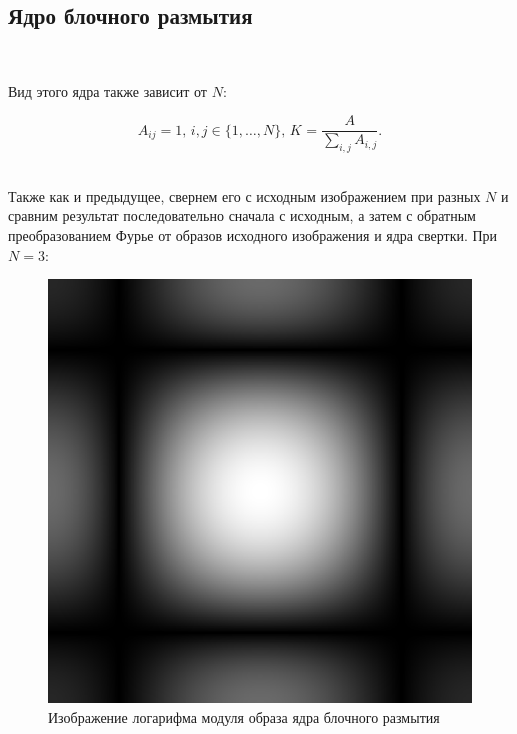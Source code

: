 \documentclass[a4paper]{article}
\begin{document}
\subsection{Ядро блочного размытия}\ 

Вид этого ядра также зависит от $N$:

$$
A_{ij} = 1, \, i,j \in \{1, \dots, N \}, \, K_{\boxed{}} = \frac{A}{\sum_{i,j} A_{i,j}}.
$$\ 

Также как и предыдущее, свернем его с исходным изображением при разных $N$ и сравним результат последовательно сначала с исходным, а затем с обратным преобразованием Фурье от образов исходного изображения и ядра свертки. При $N = 3$:

\begin{figure}[H]
    \centering
    \includegraphics[width=0.51\linewidth]{2/3_abs_fourier_log_norm_block.png}
    \caption{Изображение логарифма модуля образа ядра блочного размытия}
\end{figure}\noindent
\end{document}
